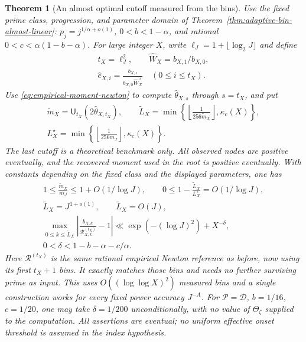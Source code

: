 \documentclass[11pt]{article}
\newtheorem{theorem}{Theorem}[section]
\theoremstyle{definition}
\begin{document}
\begin{theorem}[An almost optimal cutoff measured from the bins]
\label{thm:empirical-moment-cutoff}
Use the fixed prime class, progression, and parameter domain of
Theorem~\ref{thm:adaptive-bin-almost-linear}:
$p_j=j^{1/\alpha+o(1)}$, $0<b<1-\alpha$, and rational
$0<c<\alpha(1-b-\alpha)$.
For large integer $X$, write $\ell_J=1+\lfloor\log_2J\rfloor$
and define
\begin{equation}
 \begin{gathered}
 t_X=\ell_J^2,\qquad \widehat W_X=b_{X,1}/b_{X,0},\\
 \widehat e_{X,i}
       =\frac{b_{X,i}}{b_{X,0}\widehat W_X^{\,i}}
                              \quad(0\le i\le t_X).
 \end{gathered}
 \label{eq:empirical-cutoff-observed-coefficients}
\end{equation}
Use \eqref{eq:empirical-moment-newton} to compute
$\widehat\theta_{X,s}$ through $s=t_X$, and put
\begin{equation}
 \begin{gathered}
 \widetilde m_X
        =\mathsf U_{t_X}(2\widehat\theta_{X,t_X}),\qquad
 \widetilde L_X=\min\left\{
       \left\lfloor\frac1{256\widetilde m_X}\right\rfloor,
                                      \kappa_c(X)\right\},\\
 L_X^\star=\min\left\{
       \left\lfloor\frac1{256m_J}\right\rfloor,
                                      \kappa_c(X)\right\}.
 \end{gathered}
 \label{eq:empirical-cutoff-measured-and-ideal}
\end{equation}
The last cutoff is a theoretical benchmark only.
All observed nodes are positive eventually, and the recovered
moment used in the root is positive eventually.
With constants depending on the fixed class and the displayed
parameters, one has
\begin{equation}
 \begin{gathered}
 1\le\frac{\widetilde m_X}{m_J}
                   \le1+O(1/\log J),\qquad
 0\le1-\frac{\widetilde L_X}{L_X^\star}
                         =O(1/\log J),\\
 \widetilde L_X=J^{1+o(1)},\qquad
 \widetilde L_X=O(J),\\
 \max_{0\le k\le\widetilde L_X}
 \left|\frac{b_{X,k}}{\mathcal R^{(t_X)}_{X,k}}-1\right|
       \ll \exp(-(\log J)^2)+X^{-\delta},\\
 0<\delta<1-b-\alpha-c/\alpha .
 \end{gathered}
 \label{eq:empirical-cutoff-profile}
\end{equation}
Here $\mathcal R^{(t_X)}$ is the same rational empirical Newton
reference as before, now using its first $t_X+1$ bins.
It exactly matches those bins and needs no further surviving
prime as input.
This uses $O((\log\log X)^2)$ measured bins and a single
construction works for every fixed power accuracy $J^{-A}$.
For $\mathcal P=\mathcal D$, $b=1/16$, $c=1/20$, one may
take $\delta=1/200$ unconditionally, with no value of
$\Theta_\zeta$ supplied to the computation.
All assertions are eventual; no uniform effective onset
threshold is assumed in the index hypothesis.
\end{theorem}
\end{document}
